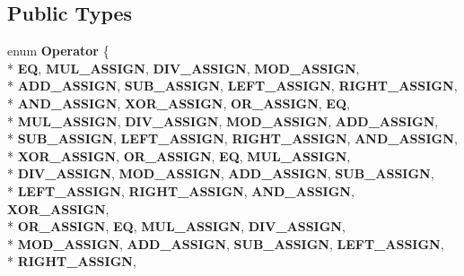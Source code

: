 \subsection*{Public Types}
\begin{DoxyCompactItemize}
\item 
enum {\bfseries Operator} \{ \\*
{\bfseries E\-Q}, 
{\bfseries M\-U\-L\-\_\-\-A\-S\-S\-I\-G\-N}, 
{\bfseries D\-I\-V\-\_\-\-A\-S\-S\-I\-G\-N}, 
{\bfseries M\-O\-D\-\_\-\-A\-S\-S\-I\-G\-N}, 
\\*
{\bfseries A\-D\-D\-\_\-\-A\-S\-S\-I\-G\-N}, 
{\bfseries S\-U\-B\-\_\-\-A\-S\-S\-I\-G\-N}, 
{\bfseries L\-E\-F\-T\-\_\-\-A\-S\-S\-I\-G\-N}, 
{\bfseries R\-I\-G\-H\-T\-\_\-\-A\-S\-S\-I\-G\-N}, 
\\*
{\bfseries A\-N\-D\-\_\-\-A\-S\-S\-I\-G\-N}, 
{\bfseries X\-O\-R\-\_\-\-A\-S\-S\-I\-G\-N}, 
{\bfseries O\-R\-\_\-\-A\-S\-S\-I\-G\-N}, 
{\bfseries E\-Q}, 
\\*
{\bfseries M\-U\-L\-\_\-\-A\-S\-S\-I\-G\-N}, 
{\bfseries D\-I\-V\-\_\-\-A\-S\-S\-I\-G\-N}, 
{\bfseries M\-O\-D\-\_\-\-A\-S\-S\-I\-G\-N}, 
{\bfseries A\-D\-D\-\_\-\-A\-S\-S\-I\-G\-N}, 
\\*
{\bfseries S\-U\-B\-\_\-\-A\-S\-S\-I\-G\-N}, 
{\bfseries L\-E\-F\-T\-\_\-\-A\-S\-S\-I\-G\-N}, 
{\bfseries R\-I\-G\-H\-T\-\_\-\-A\-S\-S\-I\-G\-N}, 
{\bfseries A\-N\-D\-\_\-\-A\-S\-S\-I\-G\-N}, 
\\*
{\bfseries X\-O\-R\-\_\-\-A\-S\-S\-I\-G\-N}, 
{\bfseries O\-R\-\_\-\-A\-S\-S\-I\-G\-N}, 
{\bfseries E\-Q}, 
{\bfseries M\-U\-L\-\_\-\-A\-S\-S\-I\-G\-N}, 
\\*
{\bfseries D\-I\-V\-\_\-\-A\-S\-S\-I\-G\-N}, 
{\bfseries M\-O\-D\-\_\-\-A\-S\-S\-I\-G\-N}, 
{\bfseries A\-D\-D\-\_\-\-A\-S\-S\-I\-G\-N}, 
{\bfseries S\-U\-B\-\_\-\-A\-S\-S\-I\-G\-N}, 
\\*
{\bfseries L\-E\-F\-T\-\_\-\-A\-S\-S\-I\-G\-N}, 
{\bfseries R\-I\-G\-H\-T\-\_\-\-A\-S\-S\-I\-G\-N}, 
{\bfseries A\-N\-D\-\_\-\-A\-S\-S\-I\-G\-N}, 
{\bfseries X\-O\-R\-\_\-\-A\-S\-S\-I\-G\-N}, 
\\*
{\bfseries O\-R\-\_\-\-A\-S\-S\-I\-G\-N}, 
{\bfseries E\-Q}, 
{\bfseries M\-U\-L\-\_\-\-A\-S\-S\-I\-G\-N}, 
{\bfseries D\-I\-V\-\_\-\-A\-S\-S\-I\-G\-N}, 
\\*
{\bfseries M\-O\-D\-\_\-\-A\-S\-S\-I\-G\-N}, 
{\bfseries A\-D\-D\-\_\-\-A\-S\-S\-I\-G\-N}, 
{\bfseries S\-U\-B\-\_\-\-A\-S\-S\-I\-G\-N}, 
{\bfseries L\-E\-F\-T\-\_\-\-A\-S\-S\-I\-G\-N}, 
\\*
{\bfseries R\-I\-G\-H\-T\-\_\-\-A\-S\-S\-I\-G\-N}, 

\end{DoxyCompactItemize}
